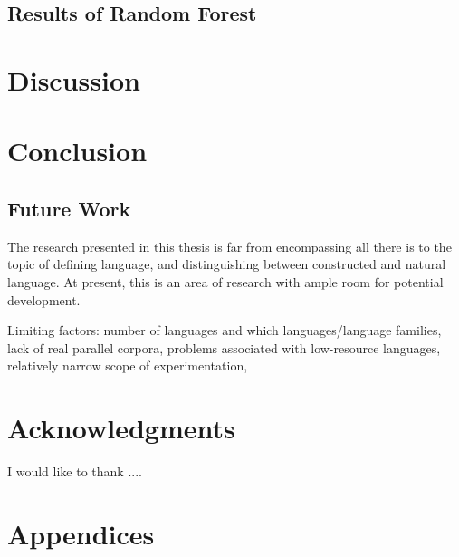 \documentclass[12pt,a4paper]{article}
\numberwithin{figure}{section}
\numberwithin{table}{section}
\numberwithin{definition}{section}
\begin{document}
\subsection{Results of Random Forest}
\label{ssec:randomforestresults}

\newpage
\section{Discussion}
\label{sec:discussion}


\newpage
\section{Conclusion}
\label{sec:conclusion}

\subsection{Future Work}
\label{ssec:futurework}

The research presented in this thesis is far from encompassing all there is to the topic of defining language, and distinguishing between constructed and natural language. At present, this is an area of research with ample room for potential development. 

Limiting factors: number of languages and which languages/language families, lack of real parallel corpora, problems associated with low-resource languages, relatively narrow scope of experimentation,

\newpage
\section{Acknowledgments}
\label{sec:acknowledgments}
I would like to thank ....

\newpage
\printbibliography

\newpage
\section{Appendices}
\label{sec:appendices}
\end{document}
